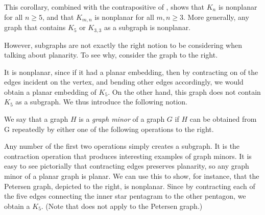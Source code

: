 \documentclass{tufte-handout}
\begin{document}
This corollary, combined with the contrapositive of , shows that \( K_n \) is nonplanar
for all \( n \geq 5 \), and that \( K_{m,n} \) is nonplanar for all \( m,n \geq 3 \). More generally, any graph
that contains \( K_5 \) or \( K_{3,3} \) as a subgraph is nonplanar.

However, subgraphs are not exactly the right notion to be considering when talking about planarity.
To see why, consider the graph to the right.

It is nonplanar, since if it had a planar embedding, then by contracting on of the edges incident on the vertex,
and bending other edges accordingly, we would obtain a planar embedding of \( K_5 \). On the other hand,
this graph does not contain \( K_5 \) as a subgraph. We thus introduce the following notion.

We say that a graph \( H \) is a \textit{graph minor} of a graph \( G \) if \( H \) can be obtained from G repeatedly by either
one of the following operations to the right.

Any number of the first two operations simply creates a subgraph. It is the contraction operation that produces interesting
examples of graph minors. It is easy to see pictorially that contracting edges preserves planarity,
so any graph minor of a planar graph is planar. We can use this to show, for instance, that the Petersen graph,
depicted to the right, is nonplanar. Since by contracting each of the five edges connecting the inner star pentagram
to the other pentagon, we obtain a \( K_{5} \). (Note that  does not apply to the Petersen graph.)
\end{document}

